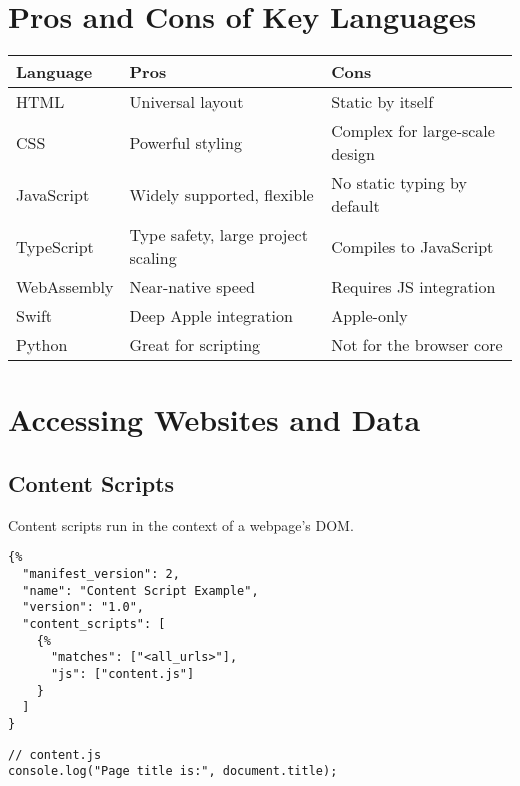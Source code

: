 \documentclass[12pt,a4paper]{article}
\begin{document}
\section{Pros and Cons of Key Languages}
\renewcommand{\arraystretch}{1.2}
\begin{center}
    \begin{tabular}{|m{3cm}|m{5cm}|m{5cm}|}
        \hline
        \textbf{Language} & \textbf{Pros}                      & \textbf{Cons}                  \\
        \hline
        HTML              & Universal layout                   & Static by itself               \\
        \hline
        CSS               & Powerful styling                   & Complex for large-scale design \\
        \hline
        JavaScript        & Widely supported, flexible         & No static typing by default    \\
        \hline
        TypeScript        & Type safety, large project scaling & Compiles to JavaScript         \\
        \hline
        WebAssembly       & Near-native speed                  & Requires JS integration        \\
        \hline
        Swift             & Deep Apple integration             & Apple-only                     \\
        \hline
        Python            & Great for scripting                & Not for the browser core       \\
        \hline
    \end{tabular}
\end{center}

\section{Accessing Websites and Data}
\subsection{Content Scripts}
Content scripts run in the context of a webpage’s DOM.

\begin{verbatim}
{%
  "manifest_version": 2,
  "name": "Content Script Example",
  "version": "1.0",
  "content_scripts": [
    {%
      "matches": ["<all_urls>"],
      "js": ["content.js"]
    }
  ]
}
\end{verbatim}

\begin{verbatim}
// content.js
console.log("Page title is:", document.title);
\end{verbatim}
\end{document}

